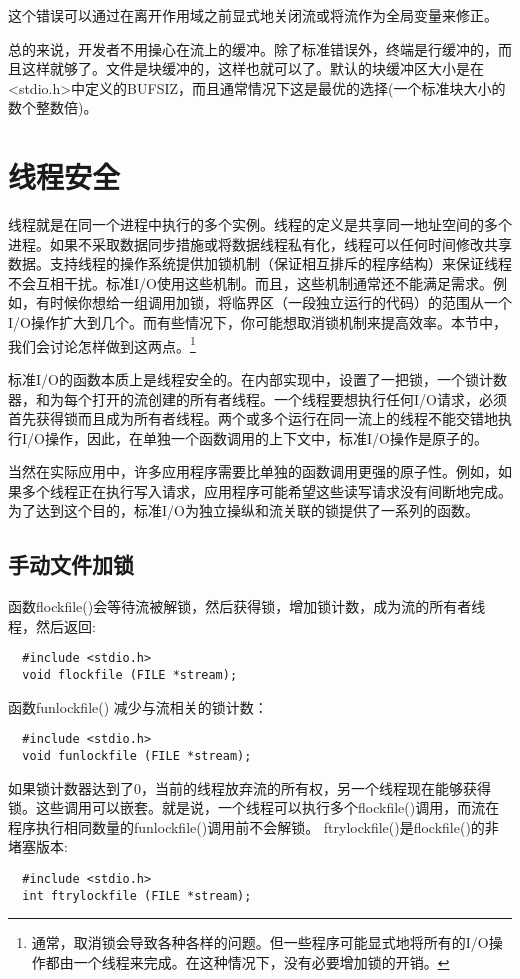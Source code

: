 这个错误可以通过在离开作用域之前显式地关闭流或将流作为全局变量来修正。

总的来说，开发者不用操心在流上的缓冲。除了标准错误外，终端是行缓冲的，而且这样就够了。文件是块缓冲的，这样也就可以了。默认的块缓冲区大小是在<stdio.h>中定义的BUFSIZ，而且通常情况下这是最优的选择(一个标准块大小的数个整数倍)。 

\section{线程安全}

线程就是在同一个进程中执行的多个实例。线程的定义是共享同一地址空间的多个进程。如果不采取数据同步措施或将数据线程私有化，线程可以任何时间修改共享数据。支持线程的操作系统提供加锁机制（保证相互排斥的程序结构）来保证线程不会互相干扰。标准I/O使用这些机制。而且，这些机制通常还不能满足需求。例如，有时候你想给一组调用加锁，将临界区（一段独立运行的代码）的范围从一个I/O操作扩大到几个。而有些情况下，你可能想取消锁机制来提高效率。本节中，我们会讨论怎样做到这两点。\footnote[1]{通常，取消锁会导致各种各样的问题。但一些程序可能显式地将所有的I/O操作都由一个线程来完成。在这种情况下，没有必要增加锁的开销。}

标准I/O的函数本质上是线程安全的。在内部实现中，设置了一把锁，一个锁计数器，和为每个打开的流创建的所有者线程。一个线程要想执行任何I/O请求，必须首先获得锁而且成为所有者线程。两个或多个运行在同一流上的线程不能交错地执行I/O操作，因此，在单独一个函数调用的上下文中，标准I/O操作是原子的。

当然在实际应用中，许多应用程序需要比单独的函数调用更强的原子性。例如，如果多个线程正在执行写入请求，应用程序可能希望这些读写请求没有间断地完成。为了达到这个目的，标准I/O为独立操纵和流关联的锁提供了一系列的函数。


\subsection{手动文件加锁}

函数flockfile()会等待流被解锁，然后获得锁，增加锁计数，成为流的所有者线程，然后返回:
\begin{lstlisting}
  #include <stdio.h>
  void flockfile (FILE *stream);
\end{lstlisting}

函数funlockfile() 减少与流相关的锁计数：
\begin{lstlisting}
  #include <stdio.h>
  void funlockfile (FILE *stream);
\end{lstlisting}

如果锁计数器达到了0，当前的线程放弃流的所有权，另一个线程现在能够获得锁。这些调用可以嵌套。就是说，一个线程可以执行多个flockfile()调用，而流在程序执行相同数量的funlockfile()调用前不会解锁。 ftrylockfile()是flockfile()的非堵塞版本:
\begin{lstlisting}
  #include <stdio.h>
  int ftrylockfile (FILE *stream);
\end{lstlisting}

